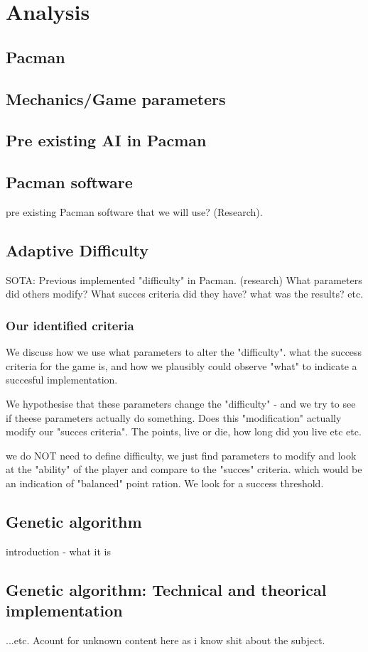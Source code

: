 \section{Analysis} \label{sec:analysis}




\subsection{Pacman}

\subsection{Mechanics/Game parameters}
\subsection{Pre existing AI in Pacman}
\subsection{Pacman software}
pre existing Pacman software that we will use? (Research).





\subsection{Adaptive Difficulty}
SOTA: Previous implemented "difficulty" in Pacman. (research)
What parameters did others modify?
What succes criteria did they have?
what was the results? etc.

\subsubsection{Our identified criteria}
We discuss how we use what parameters to alter the "difficulty". what the success criteria for the game is, and how we plausibly could observe "what" to indicate a succesful implementation.

	We hypothesise that these parameters change the "difficulty" - and we try to see if
	theese parameters actually do something. Does this "modification" actually 
	modify our "succes criteria". The points, live or die, how long did you live etc etc.
	
	we do NOT need to define difficulty, we just find parameters to modify and look at the "ability" of the player and compare to the "succes" criteria. which would be an indication of "balanced" 
point ration. We look for a success threshold.



\subsection{Genetic algorithm}
introduction - what it is
\subsection{Genetic algorithm: Technical and theorical implementation}
...etc. Acount for unknown content here as i know shit about the subject.

